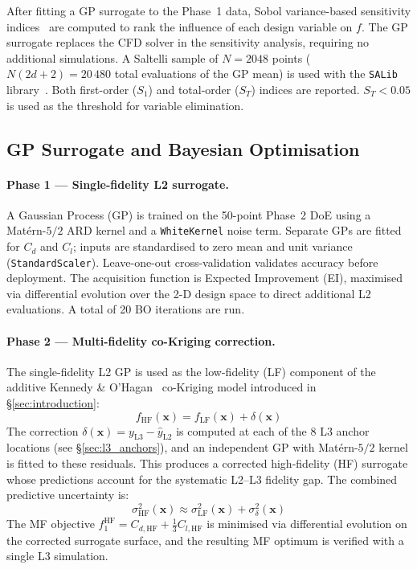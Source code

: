 After fitting a GP surrogate to the Phase~1 data, Sobol variance-based sensitivity indices~\cite{saltelli2010} are computed to rank the influence of each design variable on $f$. The GP surrogate replaces the CFD solver in the sensitivity analysis, requiring no additional simulations. A Saltelli sample of $N = 2048$ points ($N(2d+2) = 20\,480$ total evaluations of the GP mean) is used with the \texttt{SALib} library~\cite{salib}. Both first-order ($S_1$) and total-order ($S_T$) indices are reported. $S_T < 0.05$ is used as the threshold for variable elimination.

\subsection{GP Surrogate and Bayesian Optimisation}
\label{sec:surrogate}

\paragraph{Phase 1 — Single-fidelity L2 surrogate.}
A Gaussian Process (GP) is trained on the 50-point Phase~2 DoE using a Mat\'{e}rn-$5/2$ ARD kernel and a \texttt{WhiteKernel} noise term. Separate GPs are fitted for $C_d$ and $C_l$; inputs are standardised to zero mean and unit variance (\texttt{StandardScaler}). Leave-one-out cross-validation validates accuracy before deployment. The acquisition function is Expected Improvement (EI), maximised via differential evolution over the 2-D design space to direct additional L2 evaluations. A total of 20 BO iterations are run.

\paragraph{Phase 2 — Multi-fidelity co-Kriging correction.}
The single-fidelity L2 GP is used as the low-fidelity (LF) component of the additive Kennedy \& O'Hagan~\cite{kennedy2000} co-Kriging model introduced in \S\ref{sec:introduction}:
\[
    f_\mathrm{HF}(\mathbf{x}) = f_\mathrm{LF}(\mathbf{x}) + \delta(\mathbf{x})
\]
The correction $\delta(\mathbf{x}) = y_\mathrm{L3} - \hat{y}_\mathrm{L2}$ is computed at each of the 8 L3 anchor locations (see \S\ref{sec:l3_anchors}), and an independent GP with Mat\'{e}rn-$5/2$ kernel is fitted to these residuals. This produces a corrected high-fidelity (HF) surrogate whose predictions account for the systematic L2--L3 fidelity gap. The combined predictive uncertainty is:
\[
    \sigma^2_\mathrm{HF}(\mathbf{x}) \approx \sigma^2_\mathrm{LF}(\mathbf{x}) + \sigma^2_\delta(\mathbf{x})
\]
The MF objective $f_1^\mathrm{HF} = C_{d,\mathrm{HF}} + \tfrac{1}{3}C_{l,\mathrm{HF}}$ is minimised via differential evolution on the corrected surrogate surface, and the resulting MF optimum is verified with a single L3 simulation.

